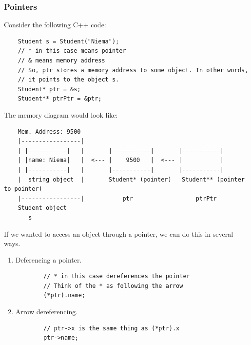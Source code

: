 \documentclass[letterpaper]{article}
\begin{document}
\subsubsection{Pointers}
Consider the following C++ code: 
\begin{verbatim}
    Student s = Student("Niema");
    // * in this case means pointer 
    // & means memory address
    // So, ptr stores a memory address to some object. In other words, 
    // it points to the object s. 
    Student* ptr = &s; 
    Student** ptrPtr = &ptr; 
\end{verbatim}
The memory diagram would look like: 
\begin{verbatim}
    Mem. Address: 9500 
    |-----------------|
    | |-----------|   |       |-----------|       |-----------|
    | |name: Niema|   |  <--- |    9500   |  <--- |           |
    | |-----------|   |       |-----------|       |-----------|
    |  string object  |       Student* (pointer)   Student** (pointer to pointer) 
    |-----------------|           ptr                  ptrPtr
    Student object      
       s
\end{verbatim} 
If we wanted to access an object through a pointer, we can do this in several ways. 
\begin{enumerate}
    \item Deferencing a pointer. 
    \begin{verbatim}
        // * in this case dereferences the pointer
        // Think of the * as following the arrow  
        (*ptr).name; 
    \end{verbatim}

    \item Arrow dereferencing. 
    \begin{verbatim}
        // ptr->x is the same thing as (*ptr).x
        ptr->name; 
    \end{verbatim}
\end{enumerate}
\end{document}
